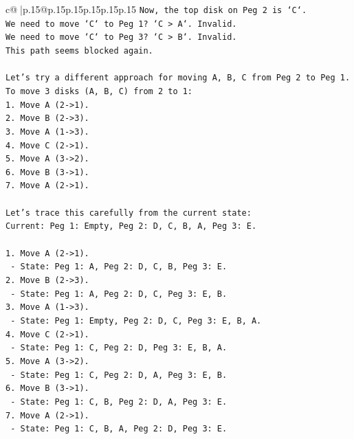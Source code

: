 \documentclass{article}
\begin{document}
{\begin{supertabular}{c@{$\;$}|p{.15\linewidth}@{}p{.15\linewidth}p{.15\linewidth}p{.15\linewidth}p{.15\linewidth}p{.15\linewidth}}
{{{\texttt{Now, the top disk on Peg 2 is `C`.} \\
\texttt{We need to move `C` to Peg 1? `C > A`. Invalid.} \\
\texttt{We need to move `C` to Peg 3? `C > B`. Invalid.} \\
\texttt{This path seems blocked again.} \\
\\ 
\texttt{Let's try a different approach for moving A, B, C from Peg 2 to Peg 1.} \\
\texttt{To move 3 disks (A, B, C) from 2 to 1:} \\
\texttt{1. Move A (2{-}>1).} \\
\texttt{2. Move B (2{-}>3).} \\
\texttt{3. Move A (1{-}>3).} \\
\texttt{4. Move C (2{-}>1).} \\
\texttt{5. Move A (3{-}>2).} \\
\texttt{6. Move B (3{-}>1).} \\
\texttt{7. Move A (2{-}>1).} \\
\\ 
\texttt{Let's trace this carefully from the current state:} \\
\texttt{Current: Peg 1: Empty, Peg 2: D, C, B, A, Peg 3: E.} \\
\\ 
\texttt{1. Move A (2{-}>1).} \\
\texttt{   {-} State: Peg 1: A, Peg 2: D, C, B, Peg 3: E.} \\
\texttt{2. Move B (2{-}>3).} \\
\texttt{   {-} State: Peg 1: A, Peg 2: D, C, Peg 3: E, B.} \\
\texttt{3. Move A (1{-}>3).} \\
\texttt{   {-} State: Peg 1: Empty, Peg 2: D, C, Peg 3: E, B, A.} \\
\texttt{4. Move C (2{-}>1).} \\
\texttt{   {-} State: Peg 1: C, Peg 2: D, Peg 3: E, B, A.} \\
\texttt{5. Move A (3{-}>2).} \\
\texttt{   {-} State: Peg 1: C, Peg 2: D, A, Peg 3: E, B.} \\
\texttt{6. Move B (3{-}>1).} \\
\texttt{   {-} State: Peg 1: C, B, Peg 2: D, A, Peg 3: E.} \\
\texttt{7. Move A (2{-}>1).} \\
\texttt{   {-} State: Peg 1: C, B, A, Peg 2: D, Peg 3: E.} \\
}}}
\end{supertabular}}
\end{document}
